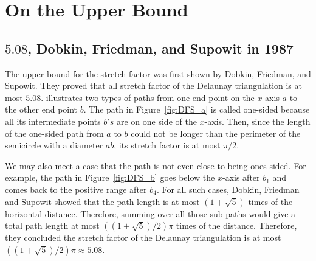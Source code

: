 \section{On the Upper Bound}

\subsection{\texorpdfstring{$5.08$}{Lg},  Dobkin, Friedman, and Supowit in 1987}
The upper bound for the stretch factor was first shown by Dobkin, Friedman, and Supowit. They proved that all stretch factor of the Delaunay triangulation is at most $5.08$.  illustrates two types of paths from one end point on the $x$-axis $a$ to the other end point $b$. The path in Figure~\ref{fig:DFS_a} is called one-sided because all its intermediate points $b's$ are on one side of the $x$-axis. Then, since the length of the one-sided path from $a$ to $b$ could not be longer than the perimeter of the semicircle with a diameter $ab$, its stretch factor is at most $\pi/2$. 

We may also meet a case that the path is not even close to being ones-sided. For example, the path in Figure~\ref{fig:DFS_b} goes below the $x$-axis after $b_1$ and comes back to the positive range after $b_4$. For all such cases, Dobkin, Friedman and Supowit showed that the path length is at most $(1+\sqrt{5})$ times of the horizontal distance. Therefore, summing over all those sub-paths  would give a total path length at most $((1+\sqrt{5})/2)\pi$ times of  the distance. Therefore, they concluded the stretch factor of the Delaunay triangulation is at most $((1+\sqrt{5})/2)\pi\approx 5.08
$.




